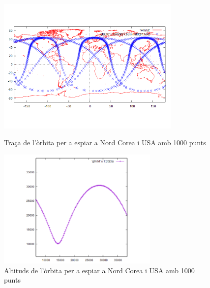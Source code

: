 \documentclass[12pt]{article}
\begin{document}
\begin{figure}
\centering
\includegraphics[width=0.8\textwidth]{orbita-USA-KPOP-EU.png}
\caption{Traça de l'òrbita per a espiar a Nord Corea i USA amb 1000 punts}
\label{fig:my_label}

\includegraphics[width=0.7\textwidth]{altitud-USA-KPOP_EU.png}
\caption{Altituds de l'òrbita per a espiar a Nord Corea i USA amb 1000 punts}
\label{fig:relacio-anomalies}
\end{figure}
\end{document}
